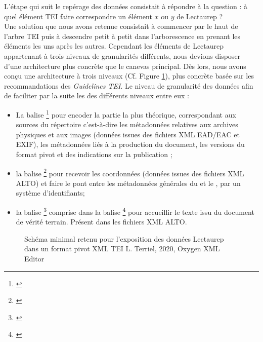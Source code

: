 L'étape qui suit le repérage des données consistait à répondre à la question : à quel élément TEI faire correspondre un élément $x$ ou $y$ de Lectaurep ?\\ 

Une solution que nous avons retenue consistait à commencer par le haut de l'arbre TEI puis à descendre petit à petit dans l'arborescence en prenant les éléments les uns après les autres. Cependant les éléments de Lectaurep appartenant à trois niveaux de granularités différents, nous devions disposer d'une architecture plus concrète que le canevas  principal. Dès lors, nous avons conçu une architecture à trois niveaux (Cf. Figure \ref{fig:structure_general_template_tei_lectaurep}), plus concrète basée sur les recommandations des \textit{Guidelines TEI}. Le niveau de granularité des données afin de faciliter par la suite les des différents niveaux entre eux : 
\begin{itemize}
    \item La balise \footnote{\cite{tei_tei_nodate}} pour encoder la partie la plus théorique, correspondant aux sources du répertoire c'est-à-dire les métadonnées relatives aux archives physiques et aux images (données issues des fichiers XML EAD/EAC et EXIF), les métadonnées liés à la production du document, les versions du format pivot et des indications sur la publication ;
    \item la balise \footnote{\cite{tei_tei_nodate-2}} pour recevoir les coordonnées (données issues des fichiers XML ALTO) et faire le pont entre les métadonnées générales du  et le , par un système d'identifiants;
    \item la balise \footnote{\cite{tei_tei_nodate-3}} comprise dans la balise \footnote{\cite{tei_tei_nodate-1}} pour accueillir le texte issu du document de vérité terrain. Présent dans les fichiers XML ALTO.
\end{itemize}

\begin{figure}[h]
    \centering
    \centerline{}
    \caption{Schéma minimal retenu pour l'exposition des données Lectaurep dans un format pivot XML TEI \textcopyright L. Terriel, 2020, Oxygen XML Editor}
    \label{fig:structure_general_template_tei_lectaurep}
\end{figure}
\newpage

